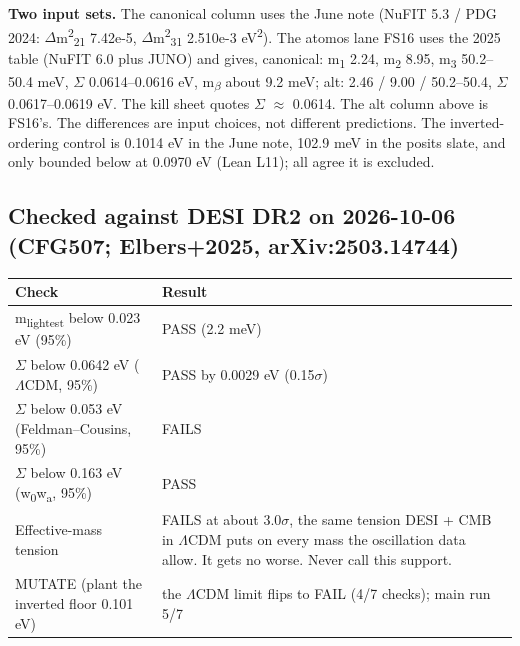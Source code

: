 \documentclass[10pt]{article}
\begin{document}
\textbf{Two input sets.} The canonical column uses the June note (NuFIT 5.3 / PDG 2024: \ensuremath{\Delta}m\textsuperscript{2}\textsubscript{2}\textsubscript{1} 7.42e-5, \ensuremath{\Delta}m\textsuperscript{2}\textsubscript{3}\textsubscript{1} 2.510e-3 eV\textsuperscript{2}). The atomos lane FS16 uses the 2025 table (NuFIT 6.0 plus JUNO) and gives, canonical: m\textsubscript{1} 2.24, m\textsubscript{2} 8.95, m\textsubscript{3} 50.2--50.4 meV, \ensuremath{\Sigma} 0.0614--0.0616 eV, m\textsubscript{\ensuremath{\beta}} about 9.2 meV; alt: 2.46 / 9.00 / 50.2--50.4, \ensuremath{\Sigma} 0.0617--0.0619 eV. The kill sheet quotes \ensuremath{\Sigma} \ensuremath{\approx} 0.0614. The alt column above is FS16's. The differences are input choices, not different predictions. The inverted-ordering control is 0.1014 eV in the June note, 102.9 meV in the posits slate, and only bounded below at 0.0970 eV (Lean L11); all agree it is excluded.


\subsection*{Checked against DESI DR2 on 2026-10-06 (CFG507; Elbers+2025, arXiv:2503.14744)}

{\footnotesize\begin{longtable}{>{\raggedright\arraybackslash}p{\dimexpr(\linewidth-4\tabcolsep)/2\relax}>{\raggedright\arraybackslash}p{\dimexpr(\linewidth-4\tabcolsep)/2\relax}}
\toprule
\textbf{Check} & \textbf{Result} \\
\midrule
\endhead
m\textsubscript{lightest} below 0.023 eV (95\%) & PASS (2.2 meV) \\
\ensuremath{\Sigma} below 0.0642 eV (\ensuremath{\Lambda}CDM, 95\%) & PASS by 0.0029 eV (0.15\ensuremath{\sigma}) \\
\ensuremath{\Sigma} below 0.053 eV (Feldman--Cousins, 95\%) & FAILS \\
\ensuremath{\Sigma} below 0.163 eV (w\textsubscript{0}w\textsubscript{a}, 95\%) & PASS \\
Effective-mass tension & FAILS at about 3.0\ensuremath{\sigma}, the same tension DESI + CMB in \ensuremath{\Lambda}CDM puts on every mass the oscillation data allow. It gets no worse. Never call this support. \\
MUTATE (plant the inverted floor 0.101 eV) & the \ensuremath{\Lambda}CDM limit flips to FAIL (4/7 checks); main run 5/7 \\
\bottomrule
\end{longtable}}
\end{document}
